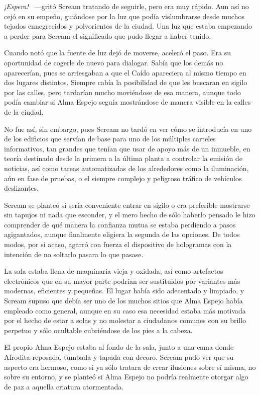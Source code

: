 \emph{¡Espera!} ~---gritó Scream tratando de seguirle, pero era muy rápido. Aun así no cejó en su empeño, guiándose por la luz que podía vislumbrarse desde muchos tejados ennegrecidos y polvorientos de la ciudad. Una luz que estaba empezando a perder para Scream el significado que pudo llegar a haber tenido.

Cuando notó que la fuente de luz dejó de moverse, aceleró el paso. Era su oportunidad de cogerle de nuevo para dialogar. Sabía que los demás no aparecerían, pues se arriesgaban a que el Caído apareciera al mismo tiempo en dos lugares distintos. Siempre cabía la posibilidad de que les buscaran en sigilo por las calles, pero tardarían mucho moviéndose de esa manera, aunque todo podía cambiar si Alma Espejo seguía mostrándose de manera visible en la calles de la ciudad.

No fue así, sin embargo, pues Scream no tardó en ver cómo se introducía en uno de los edificios que servían de base para uno de los múltiples carteles informativos, tan grandes que tenían que usar de apoyo más de un inmueble, en teoría destinado desde la primera a la última planta a controlar la emisión de noticias, así como tareas automatizadas de los alrededores como la iluminación, aún en fase de pruebas, o el siempre complejo y peligroso tráfico de vehículos deslizantes.

Scream se planteó si sería conveniente entrar en sigilo o era preferible mostrarse sin tapujos ni nada que esconder, y el mero hecho de sólo haberlo pensado le hizo comprender de qué manera la confianza mutua se estaba perdiendo a pasos agigantados, aunque finalmente eligiera la segunda de las opciones. De todos modos, por si acaso, agarró con fuerza el dispositivo de hologramas con la intención de no soltarlo pasara lo que pasase.

La sala estaba llena de maquinaria vieja y oxidada, así como artefactos electrónicos que en su mayor parte podrían ser sustituidos por variantes más modernas, eficientes y pequeñas. El lugar había sido adecentado y limpiado, y Scream supuso que debía ser uno de los muchos sitios que Alma Espejo había empleado como  general, aunque en su caso esa necesidad estaba más motivada por el hecho de estar a solas y no molestar a ciudadanos comunes con su brillo perpetuo y sólo ocultable cubriéndose de los pies a la cabeza.

El propio Alma Espejo estaba al fondo de la sala, junto a una cama donde Afrodita reposada, tumbada y tapada con decoro. Scream pudo ver que su aspecto era hermoso, como si ya sólo tratara de crear ilusiones sobre sí misma, no sobre su entorno, y se planteó si Alma Espejo no podría realmente otorgar algo de paz a aquella criatura atormentada.

